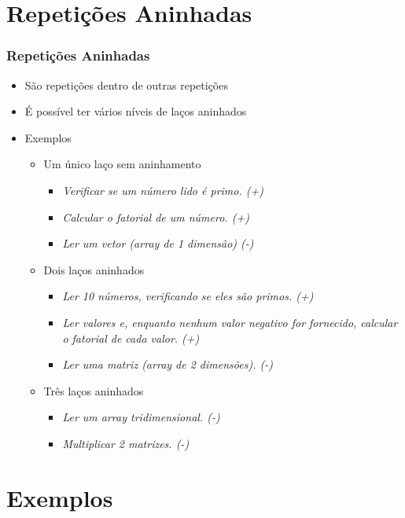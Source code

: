 \documentclass[xcolor={dvipsnames,table},aspectratio=169]{beamer}
\begin{document}
\section{Repetições Aninhadas}

\begin{frame}[fragile]\frametitle{Repetições Aninhadas}
\begin{itemize}
	\item São repetições dentro de outras repetições
	\item É possível ter vários níveis de laços aninhados
	\item Exemplos
	\begin{itemize}
		\item Um único laço sem aninhamento
		\begin{itemize}
            \item \emph{Verificar se um número lido é primo. (+)}
            \item \emph{Calcular o fatorial de um número. (+)}
            \item \emph{Ler um vetor (array de 1 dimensão) (-)}
        \end{itemize}
		\item Dois laços aninhados
		\begin{itemize}
            \item \emph{Ler 10 números, verificando se eles são primos. (+)}
            \item \emph{Ler valores e, enquanto nenhum valor negativo for fornecido, calcular o fatorial de cada valor. (+)}
            \item \emph{Ler uma matriz (array de 2 dimensões). (-)}
        \end{itemize}
		\item Três laços aninhados
		\begin{itemize}
            \item \emph{Ler um array tridimensional. (-)}
            \item \emph{Multiplicar 2 matrizes. (-)}
        \end{itemize}
	\end{itemize}
\end{itemize}
\end{frame}

\section{Exemplos}
\end{document}
